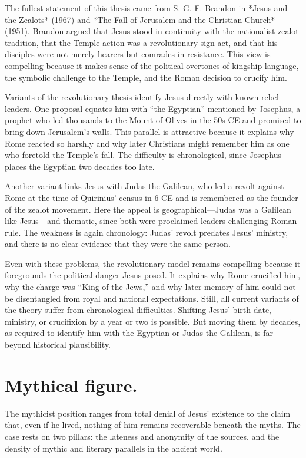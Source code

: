 The fullest statement of this thesis came from S. G. F. Brandon in *Jesus and the Zealots* (1967) and *The Fall of Jerusalem and the Christian Church* (1951).
Brandon argued that Jesus stood in continuity with the nationalist zealot tradition, that the Temple action was a revolutionary sign-act, and that his disciples were not merely hearers but comrades in resistance.
This view is compelling because it makes sense of the political overtones of kingship language, the symbolic challenge to the Temple, and the Roman decision to crucify him.

Variants of the revolutionary thesis identify Jesus directly with known rebel leaders.
One proposal equates him with “the Egyptian” mentioned by Josephus, a prophet who led thousands to the Mount of Olives in the 50s CE and promised to bring down Jerusalem’s walls.
This parallel is attractive because it explains why Rome reacted so harshly and why later Christians might remember him as one who foretold the Temple’s fall.
The difficulty is chronological, since Josephus places the Egyptian two decades too late.

Another variant links Jesus with Judas the Galilean, who led a revolt against Rome at the time of Quirinius’ census in 6 CE and is remembered as the founder of the zealot movement.
Here the appeal is geographical—Judas was a Galilean like Jesus—and thematic, since both were proclaimed leaders challenging Roman rule.
The weakness is again chronology: Judas’ revolt predates Jesus’ ministry, and there is no clear evidence that they were the same person.

Even with these problems, the revolutionary model remains compelling because it foregrounds the political danger Jesus posed.
It explains why Rome crucified him, why the charge was “King of the Jews,” and why later memory of him could not be disentangled from royal and national expectations.
Still, all current variants of the theory suffer from chronological difficulties.
Shifting Jesus’ birth date, ministry, or crucifixion by a year or two is possible.
But moving them by decades, as required to identify him with the Egyptian or Judas the Galilean, is far beyond historical plausibility.

\section{Mythical figure.}\label{sec:mythical}

The mythicist position ranges from total denial of Jesus’ existence to the claim that, even if he lived, nothing of him remains recoverable beneath the myths.
The case rests on two pillars: the lateness and anonymity of the sources, and the density of mythic and literary parallels in the ancient world.


